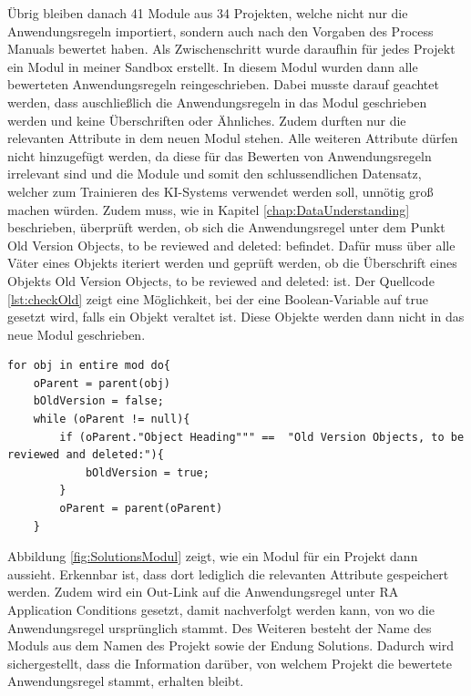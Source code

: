Übrig bleiben danach 41 Module aus 34 Projekten, welche nicht nur die Anwendungsregeln importiert, sondern auch nach den Vorgaben des Process Manuals bewertet haben. Als Zwischenschritt wurde daraufhin
für jedes Projekt ein Modul in meiner Sandbox erstellt. In diesem Modul wurden dann alle bewerteten Anwendungsregeln reingeschrieben. Dabei musste darauf geachtet werden, dass auschließlich die
Anwendungsregeln in das Modul geschrieben werden und keine Überschriften oder Ähnliches. Zudem durften nur die relevanten Attribute in dem neuen Modul stehen. Alle weiteren Attribute dürfen nicht
hinzugefügt werden, da diese für das Bewerten von Anwendungsregeln irrelevant sind und die Module und somit den schlussendlichen Datensatz, welcher zum Trainieren des KI-Systems verwendet werden soll,
unnötig groß machen würden. Zudem muss, wie in Kapitel \ref*{chap:DataUnderstanding} beschrieben, überprüft werden, ob sich die Anwendungsregel unter dem Punkt 
\glqq Old Version Objects, to be reviewed and deleted: \grqq{} befindet. Dafür muss über alle Väter eines Objekts iteriert werden und geprüft werden, ob die Überschrift eines Objekts 
\glqq Old Version Objects, to be reviewed and deleted: \grqq{} ist. Der Quellcode \ref*{lst:checkOld} zeigt eine Möglichkeit, bei der eine Boolean-Variable auf true gesetzt wird, falls ein Objekt
veraltet ist. Diese Objekte werden dann nicht in das neue Modul geschrieben.

\begin{lstlisting}[caption={Prüfen, ob Objekt veraltet ist}, captionpos=b, label = lst:checkOld] 
for obj in entire mod do{ 
    oParent = parent(obj)
    bOldVersion = false;
    while (oParent != null){
        if (oParent."Object Heading""" ==  "Old Version Objects, to be reviewed and deleted:"){
            bOldVersion = true;
        }
        oParent = parent(oParent)
    }
\end{lstlisting}

Abbildung \ref*{fig:SolutionsModul} zeigt, wie ein Modul für ein Projekt dann aussieht. Erkennbar ist, dass dort lediglich die relevanten Attribute gespeichert werden. Zudem wird ein Out-Link auf die
Anwendungsregel unter RA Application Conditions gesetzt, damit nachverfolgt werden kann, von wo die Anwendungsregel ursprünglich stammt. Des Weiteren besteht der Name des Moduls aus dem Namen
des Projekt sowie der Endung  Solutions. Dadurch wird sichergestellt, dass die Information darüber, von welchem Projekt die bewertete Anwendungsregel stammt, erhalten bleibt.


